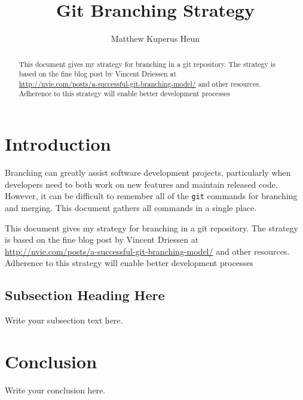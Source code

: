 \documentclass{article}
\begin{document}
\title{Git Branching Strategy}
\author{Matthew Kuperus Heun}

\maketitle


\begin{abstract}

This document gives my strategy for branching in a git repository. 
The strategy is based on the fine blog post by Vincent Driessen at\\
\url{http://nvie.com/posts/a-successful-git-branching-model/}
and other resources.
Adherence to this strategy will enable better development processes
\end{abstract}


\section{Introduction} 
\label{sec:introduction}

Branching can greatly assist software development projects, 
particularly when developers need to both 
work on new features and maintain released code.
However, it can be difficult to remember 
all of the \texttt{git} commands for branching and merging.
This document gathers all commands in a single place.

This document gives my strategy for branching in a git repository. 
The strategy is based on the fine blog post by Vincent Driessen at\\
\url{http://nvie.com/posts/a-successful-git-branching-model/}
and other resources.
Adherence to this strategy will enable better development processes



\subsection{Subsection Heading Here}
Write your subsection text here.


\section{Conclusion}
Write your conclusion here.
\end{document}
